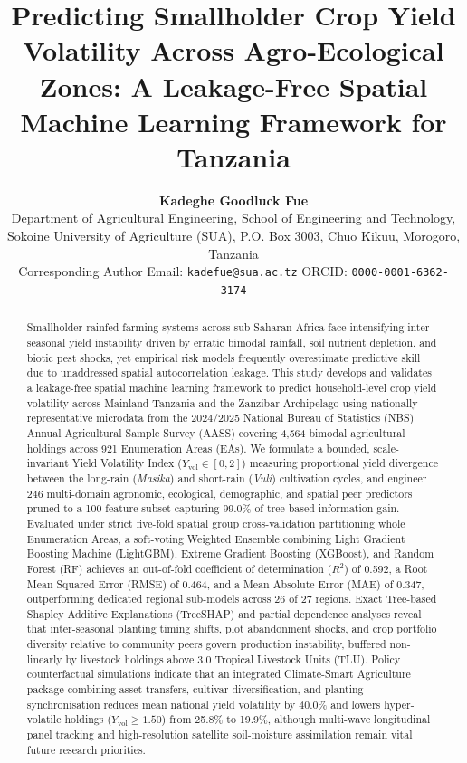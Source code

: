 \documentclass[10pt,a4paper]{article}
\title{\textbf{Predicting Smallholder Crop Yield Volatility Across Agro-Ecological Zones: A Leakage-Free Spatial Machine Learning Framework for Tanzania}}
\author{\textbf{Kadeghe Goodluck Fue}\\[4pt]
Department of Agricultural Engineering, School of Engineering and Technology,\\
Sokoine University of Agriculture (SUA), P.O. Box 3003, Chuo Kikuu, Morogoro, Tanzania\\
Corresponding Author Email: \texttt{kadefue@sua.ac.tz} \quad ORCID: \texttt{0000-0001-6362-3174}}
\date{}
\begin{document}
\linenumbers
\maketitle

\begin{abstract}
\noindent Smallholder rainfed farming systems across sub-Saharan Africa face intensifying inter-seasonal yield instability driven by erratic bimodal rainfall, soil nutrient depletion, and biotic pest shocks, yet empirical risk models frequently overestimate predictive skill due to unaddressed spatial autocorrelation leakage. This study develops and validates a leakage-free spatial machine learning framework to predict household-level crop yield volatility across Mainland Tanzania and the Zanzibar Archipelago using nationally representative microdata from the 2024/2025 National Bureau of Statistics (NBS) Annual Agricultural Sample Survey (AASS) covering 4,564 bimodal agricultural holdings across 921 Enumeration Areas (EAs). We formulate a bounded, scale-invariant Yield Volatility Index ($Y_{\mathrm{vol}} \in [0, 2]$) measuring proportional yield divergence between the long-rain (\textit{Masika}) and short-rain (\textit{Vuli}) cultivation cycles, and engineer 246 multi-domain agronomic, ecological, demographic, and spatial peer predictors pruned to a 100-feature subset capturing 99.0\% of tree-based information gain. Evaluated under strict five-fold spatial group cross-validation partitioning whole Enumeration Areas, a soft-voting Weighted Ensemble combining Light Gradient Boosting Machine (LightGBM), Extreme Gradient Boosting (XGBoost), and Random Forest (RF) achieves an out-of-fold coefficient of determination ($R^2$) of 0.592, a Root Mean Squared Error (RMSE) of 0.464, and a Mean Absolute Error (MAE) of 0.347, outperforming dedicated regional sub-models across 26 of 27 regions. Exact Tree-based Shapley Additive Explanations (TreeSHAP) and partial dependence analyses reveal that inter-seasonal planting timing shifts, plot abandonment shocks, and crop portfolio diversity relative to community peers govern production instability, buffered non-linearly by livestock holdings above 3.0 Tropical Livestock Units (TLU). Policy counterfactual simulations indicate that an integrated Climate-Smart Agriculture package combining asset transfers, cultivar diversification, and planting synchronisation reduces mean national yield volatility by 40.0\% and lowers hyper-volatile holdings ($Y_{\mathrm{vol}} \ge 1.50$) from 25.8\% to 19.9\%, although multi-wave longitudinal panel tracking and high-resolution satellite soil-moisture assimilation remain vital future research priorities.
\end{abstract}
\end{document}
